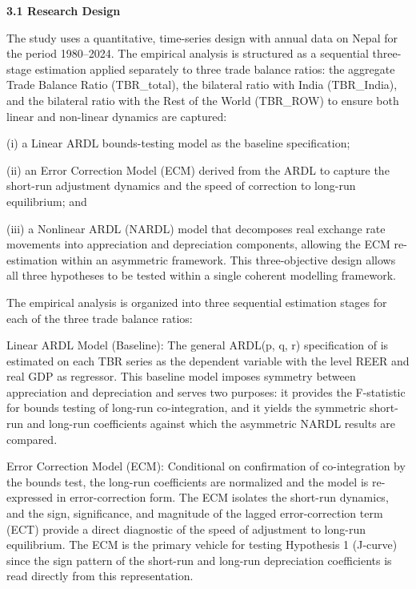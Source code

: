 \documentclass[12pt]{article}
\begin{document}
\vspace{0.5cm}
\noindent\textbf{3.1 Research Design}

The study uses a quantitative, time-series design with annual data on Nepal for the period 1980–2024. The empirical analysis is structured as a sequential three-stage estimation applied separately to three trade balance ratios: the aggregate Trade Balance Ratio (TBR\_total), the bilateral ratio with India (TBR\_India), and the bilateral ratio with the Rest of the World (TBR\_ROW) to ensure both linear and non-linear dynamics are captured:

(i) a Linear ARDL bounds-testing model as the baseline specification;

(ii) an Error Correction Model (ECM) derived from the ARDL to capture the short-run adjustment dynamics and the speed of correction to long-run equilibrium; and

(iii) a Nonlinear ARDL (NARDL) model that decomposes real exchange rate movements into appreciation and depreciation components, allowing the ECM re-estimation within an asymmetric framework. This three‑objective design allows all three hypotheses to be tested within a single coherent modelling framework.

The empirical analysis is organized into three sequential estimation stages for each of the three trade balance ratios:

Linear ARDL Model (Baseline): The general ARDL(p, q, r) specification of \textcite{Pesaran2001-kt} is estimated on each TBR series as the dependent variable with the level REER and real GDP as regressor. This baseline model imposes symmetry between appreciation and depreciation and serves two purposes: it provides the F-statistic for bounds testing of long-run co-integration, and it yields the symmetric short-run and long-run coefficients against which the asymmetric NARDL results are compared.

Error Correction Model (ECM): Conditional on confirmation of co-integration by the bounds test, the long-run coefficients are normalized and the model is re-expressed in error-correction form. The ECM isolates the short-run dynamics, and the sign, significance, and magnitude of the lagged error-correction term (ECT) provide a direct diagnostic of the speed of adjustment to long-run equilibrium. The ECM is the primary vehicle for testing Hypothesis 1 (J‑curve) since the sign pattern of the short-run and long-run depreciation coefficients is read directly from this representation.
\end{document}
